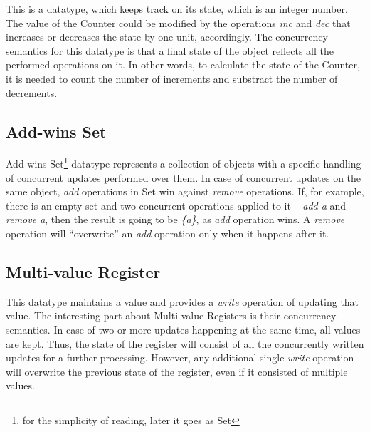 This is a datatype, which keeps track on its state, which is an integer number. The value of the Counter could be modified by the operations \textit{inc} and \textit{dec} that increases or decreases the state by one unit, accordingly\cite{3}. The concurrency semantics for this datatype is that a final state of the object reflects all the performed operations on it. In other words, to calculate the state of the Counter, it is needed to count the number of increments and substract the number of decrements. 

\subsection*{Add-wins Set}

Add-wins Set\footnote{for the simplicity of reading, later it goes as Set} datatype represents a collection of objects with a specific handling of concurrent updates performed over them. In case of concurrent updates on the same object, \textit{add} operations in Set win against \textit{remove} operations. If, for example, there is an empty set \textit{} and two concurrent operations applied to it -- \textit{add a} and \textit{remove a}, then the result is going to be \textit{\{a\}}, as \textit{add} operation wins. A \textit{remove} operation will ``overwrite'' an \textit{add} operation only when it happens after it\cite{3}. 

\subsection*{Multi-value Register}

This datatype maintains a value and provides a \textit{write} operation of updating that value. The interesting part about Multi-value Registers is their concurrency semantics. In case of two or more updates happening at the same time, all values are kept. Thus, the state of the register will consist of all the concurrently written updates for a further processing. However, any additional single \textit{write} operation will overwrite the previous state of the register, even if it consisted of multiple values\cite{39}.